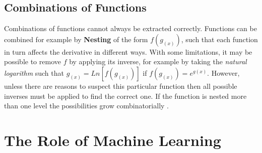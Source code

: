 \documentclass[main.tex]{subfiles}
\begin{document}
    \subsection{Combinations of Functions}
    \label{sec:back:combFunc}
    
    Combinations of functions cannot always be extracted correctly. Functions can be combined for example by \textbf{Nesting} of the form $f(g_{(x)})$, such that each function in turn affects the derivative in different ways. With some limitations, it may be possible to remove $f$ by applying its inverse, for example by taking the \textit{natural logarithm} such that $g_{(x)}=Ln\left [ f(g_{(x)})\right ]$ if $f(g_{(x)}) = e^{g(x)}$. However, unless there are reasons to suspect this particular function then all possible inverses must be applied to find the correct one. If the function is nested more than one level the possibilities grow combinatorially \cite[Chapter~M1]{tipler,functionsHandbook}. 
    
  
  \section{The Role of Machine Learning}
    
\end{document}
